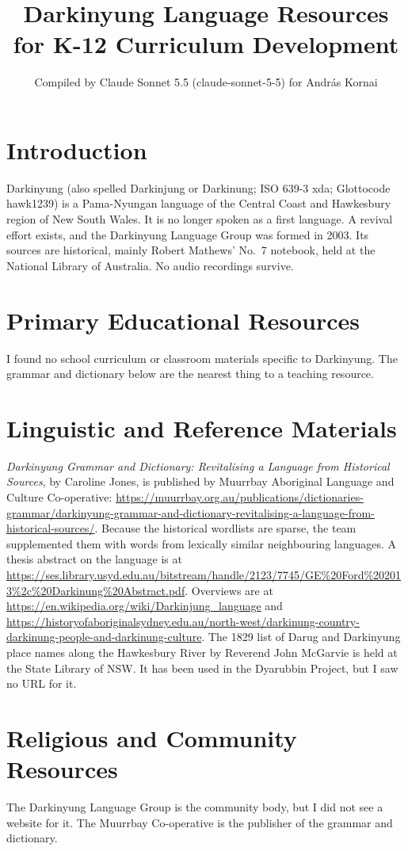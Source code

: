 \documentclass[12pt]{article}
\title{Darkinyung Language Resources for K-12 Curriculum Development}
\author{Compiled by Claude Sonnet 5.5 (claude-sonnet-5-5) for Andr\'as Kornai}
\date{}
\begin{document}
\maketitle

\section{Introduction}
Darkinyung (also spelled Darkinjung or Darkinung; ISO 639-3 xda; Glottocode hawk1239) is a Pama-Nyungan language of the Central Coast and Hawkesbury region of New South Wales. It is no longer spoken as a first language. A revival effort exists, and the Darkinyung Language Group was formed in 2003. Its sources are historical, mainly Robert Mathews' No.\ 7 notebook, held at the National Library of Australia. No audio recordings survive.

\section{Primary Educational Resources}
I found no school curriculum or classroom materials specific to Darkinyung. The grammar and dictionary below are the nearest thing to a teaching resource.

\section{Linguistic and Reference Materials}
\emph{Darkinyung Grammar and Dictionary: Revitalising a Language from Historical Sources}, by Caroline Jones, is published by Muurrbay Aboriginal Language and Culture Co-operative: \url{https://muurrbay.org.au/publications/dictionaries-grammar/darkinyung-grammar-and-dictionary-revitalising-a-language-from-historical-sources/}. Because the historical wordlists are sparse, the team supplemented them with words from lexically similar neighbouring languages. A thesis abstract on the language is at \url{https://ses.library.usyd.edu.au/bitstream/handle/2123/7745/GE%20Ford%202013%2c%20Darkinung%20Abstract.pdf}. Overviews are at \url{https://en.wikipedia.org/wiki/Darkinjung_language} and \url{https://historyofaboriginalsydney.edu.au/north-west/darkinung-country-darkinung-people-and-darkinung-culture}. The 1829 list of Darug and Darkinyung place names along the Hawkesbury River by Reverend John McGarvie is held at the State Library of NSW. It has been used in the Dyarubbin Project, but I saw no URL for it.

\section{Religious and Community Resources}
The Darkinyung Language Group is the community body, but I did not see a website for it. The Muurrbay Co-operative is the publisher of the grammar and dictionary.
\end{document}
